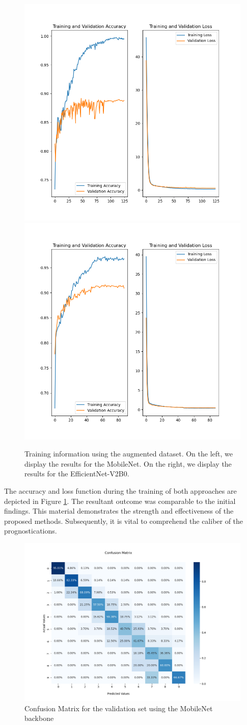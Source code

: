 \begin{figure}[h!]
    \centering
    \includegraphics[width = .49\linewidth]{Figures/train_aug.png}
    \includegraphics[width = .49\linewidth]{Figures/train_aug_en.png}
    \caption{Training information using the augmented dataset. On the left, we display the results for the MobileNet. On the right, we display the results for the EfficientNet-V2B0.}
    \label{fig:training-aug}
\end{figure}

The accuracy and loss function during the training of both approaches are depicted in Figure \ref{fig:training-aug}. The resultant outcome was comparable to the initial findings. This material demonstrates the strength and effectiveness of the proposed methods. Subsequently, it is vital to comprehend the caliber of the prognostications.

\begin{figure}[h!]
    \centering
    \includegraphics[width = .9\linewidth]{Figures/data_aug_val_mn.png}
    \caption{Confusion Matrix for the validation set using the MobileNet backbone}
    \label{fig:aug-val-mn}
\end{figure}

